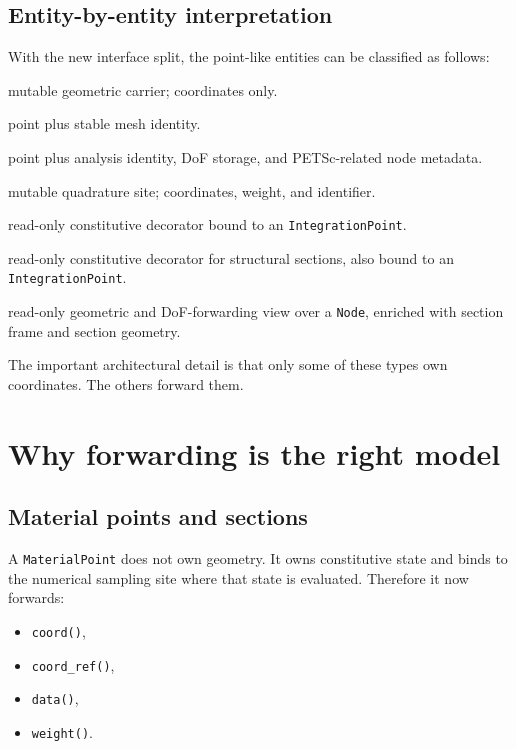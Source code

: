 \subsection{Entity-by-entity interpretation}

With the new interface split, the point-like entities can be classified as
follows:
\begin{description}[nosep]
  \item[\texttt{Point<Dim>}] mutable geometric carrier; coordinates only.
  \item[\texttt{Vertex<Dim>}] point plus stable mesh identity.
  \item[\texttt{Node<Dim, Storage>}] point plus analysis identity, DoF storage,
        and PETSc-related node metadata.
  \item[\texttt{IntegrationPoint<Dim>}] mutable quadrature site; coordinates,
        weight, and identifier.
  \item[\texttt{MaterialPoint<Policy>}] read-only constitutive decorator bound
        to an \texttt{IntegrationPoint}.
  \item[\texttt{MaterialSection<Policy>}] read-only constitutive decorator for
        structural sections, also bound to an \texttt{IntegrationPoint}.
  \item[\texttt{NodeSection<Dim>}] read-only geometric and DoF-forwarding view
        over a \texttt{Node}, enriched with section frame and section geometry.
\end{description}

The important architectural detail is that only some of these types own
coordinates.  The others forward them.

\section{Why forwarding is the right model}

\subsection{Material points and sections}

A \texttt{MaterialPoint} does not own geometry.  It owns constitutive state and
binds to the numerical sampling site where that state is evaluated.  Therefore
it now forwards:
\begin{itemize}[nosep]
  \item \texttt{coord()},
  \item \texttt{coord\_ref()},
  \item \texttt{data()},
  \item \texttt{weight()}.
\end{itemize}


